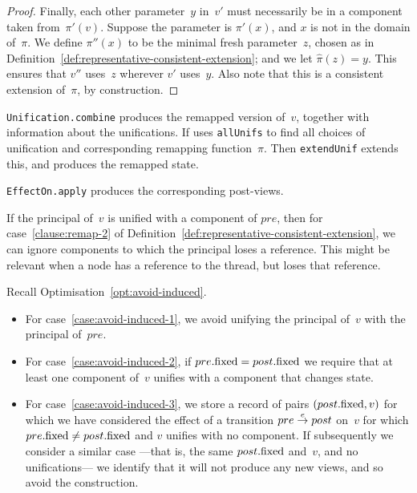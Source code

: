 \begin{proof}
Finally, each other parameter~$y$ in~$v'$ must necessarily be in a component
taken from~$\pi'(v)$.  Suppose the parameter is $\pi'(x)$, and $x$ is not in
the domain of~$\pi$.  We define $\pi''(x)$ to be the minimal fresh
parameter~$z$, chosen as in
Definition~\ref{def:representative-consistent-extension}; and we let
$\hat\pi(z) = y$.  This ensures that $v''$ uses~$z$ wherever $v'$ uses~$y$.
Also note that this is a consistent extension of~$\pi$, by construction.
\end{proof}


\begin{impNote}
\texttt{Unification.combine} produces the remapped version of~$v$, together
with information about the unifications.  If uses \texttt{allUnifs} to find
all choices of unification and corresponding remapping function~$\pi$.  Then
\texttt{extendUnif} extends this, and produces the remapped state.

\texttt{EffectOn.apply} produces the corresponding post-views.
\end{impNote}


\begin{improve} 
If the principal of~$v$ is unified with a component of $pre$, then for
case~\ref{clause:remap-2} of
Definition~\ref{def:representative-consistent-extension}, we can ignore
components to which the principal loses a reference.  This might be relevant
when a node has a reference to the thread, but loses that reference. 
\end{improve}


\begin{opt}
Recall Optimisation~\ref{opt:avoid-induced}.  
\begin{itemize}
\item For case~\ref{case:avoid-induced-1}, we avoid unifying the principal
  of~$v$ with the principal of~$pre$.

\item For case~\ref{case:avoid-induced-2}, if $pre.\mathrm{fixed} = post.\mathrm{fixed}$ we
  require that at least one component of~$v$ unifies with a component that
  changes state.

\item For case~\ref{case:avoid-induced-3}, we store a record of pairs
  $(post.\mathrm{fixed}, v)$ for which we have considered the effect of a transition
  $pre \stackrel{e}\rightarrow post$ on~$v$ for which $pre.\mathrm{fixed} \ne post.\mathrm{fixed}$ and $v$
  unifies with no component.
%
  If subsequently we consider a similar case ---that is, the same
  $post.\mathrm{fixed}$ and~$v$, and no unifications--- we identify that it will not
  produce any new views, and so avoid the construction.
\end{itemize}
\end{opt}


